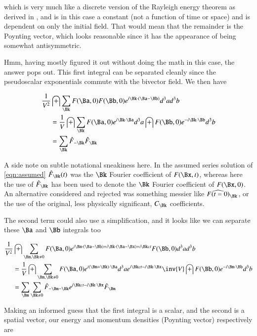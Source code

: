 \documentclass{article}
\begin{document}
which is very much like a discrete version of the Rayleigh energy theorem as derived in \cite{PJqmFourier}, and is in this case
a constant (not a function of time or space) and is dependent on only the initial field.
That would mean that the remainder is the Poynting vector,
which looks reasonable since it has the appearance of being somewhat antisymmetric.

Hmm, having mostly figured it out without doing the math in this case, the answer pops out.  This first integral can be separated cleanly since the pseudoscalar
exponentials commute with the bivector field.  We then have

\begin{align*}
\frac{1}{V^2} &\int \sum_{\Bk} F(\Ba, 0) F(\Bb, 0) e^{ i \Bk \cdot (\Ba - \Bb) } d^3 a d^3 b \\
&= \frac{1}{V} \int \sum_{\Bk} F(\Ba, 0) e^{ i \Bk \cdot \Ba } d^3 a \int F(\Bb, 0) e^{ -i \Bk \cdot \Bb } d^3 b \\
&= \sum_{\Bk} \hat{F}_{-\Bk} \hat{F}_{\Bk} \\
\end{align*}

A side note on subtle notational sneakiness here.  In the assumed series 
solution of \ref{eqn:assumed} $\hat{F}_{\Bk}(t)$ was the $\Bk$ Fourier coefficient of $F(\Bx,t)$, whereas here the use of $\hat{F}_{\Bk}$ has been used to denote the $\Bk$ Fourier coefficient of $F(\Bx,0)$.
An alternative considered and rejected was something messier like $\widehat{F(t=0)}_{\Bk}$, or the use of the original, less physically significant, $C_{\Bk}$ coefficients.

The second term could also use a simplification, and it looks like we can separate these $\Ba$ and $\Bb$ integrals too

\begin{align*}
\frac{1}{V^2} &\int \sum_{\Bm, \Bk \ne 0} F(\Ba, 0) e^{ 
i \Bm \cdot (\Ba -\Bb) 
+i \Bk \cdot (\Ba -\Bx)
+ i \Bk ct 
} F(\Bb, 0) d^3 a d^3 b \\
&=\frac{1}{V} \int \sum_{\Bm, \Bk \ne 0} F(\Ba, 0) e^{ i (\Bm + \Bk) \cdot \Ba } d^3 a
e^{ i \Bk ct -i \Bk \cdot \Bx }
\inv{V} \int F(\Bb, 0) 
e^{-i \Bm \cdot \Bb}
d^3 b
 \\
&= \sum_{\Bm} \sum_{\Bk \ne 0} \hat{F}_{-\Bm -\Bk} e^{ i \Bk ct -i \Bk \cdot \Bx } \hat{F}_{\Bm} \\
\end{align*}

Making an informed guess that the first integral is a scalar, and the second is a spatial vector, our energy and momentum densities (Poynting vector) respectively are
\end{document}
